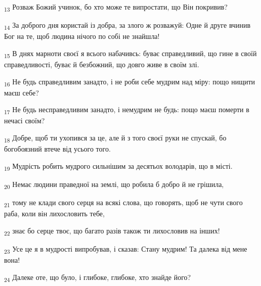 \begin{tcolorbox}
\textsubscript{13} Розваж Божий учинок, бо хто може те випростати, що Він покривив?
\end{tcolorbox}
\begin{tcolorbox}
\textsubscript{14} За доброго дня користай із добра, за злого ж розважуй: Одне й друге вчинив Бог на те, щоб людина нічого по собі не знайшла!
\end{tcolorbox}
\begin{tcolorbox}
\textsubscript{15} В днях марноти своєї я всього набачивсь: буває справедливий, що гине в своїй справедливості, буває й безбожний, що довго живе в своїм злі.
\end{tcolorbox}
\begin{tcolorbox}
\textsubscript{16} Не будь справедливим занадто, і не роби себе мудрим над міру: пощо нищити маєш себе?
\end{tcolorbox}
\begin{tcolorbox}
\textsubscript{17} Не будь несправедливим занадто, і немудрим не будь: пощо маєш померти в нечасі своїм?
\end{tcolorbox}
\begin{tcolorbox}
\textsubscript{18} Добре, щоб ти ухопився за це, але й з того своєї руки не спускай, бо богобоязний втече від усього того.
\end{tcolorbox}
\begin{tcolorbox}
\textsubscript{19} Мудрість робить мудрого сильнішим за десятьох володарів, що в місті.
\end{tcolorbox}
\begin{tcolorbox}
\textsubscript{20} Немає людини праведної на землі, що робила б добро й не грішила,
\end{tcolorbox}
\begin{tcolorbox}
\textsubscript{21} тому не клади свого серця на всякі слова, що говорять, щоб не чути свого раба, коли він лихословить тебе,
\end{tcolorbox}
\begin{tcolorbox}
\textsubscript{22} знає бо серце твоє, що багато разів також ти лихословив на інших!
\end{tcolorbox}
\begin{tcolorbox}
\textsubscript{23} Усе це я в мудрості випробував, і сказав: Стану мудрим! Та далека від мене вона!
\end{tcolorbox}
\begin{tcolorbox}
\textsubscript{24} Далеке оте, що було, і глибоке, глибоке, хто знайде його?
\end{tcolorbox}
